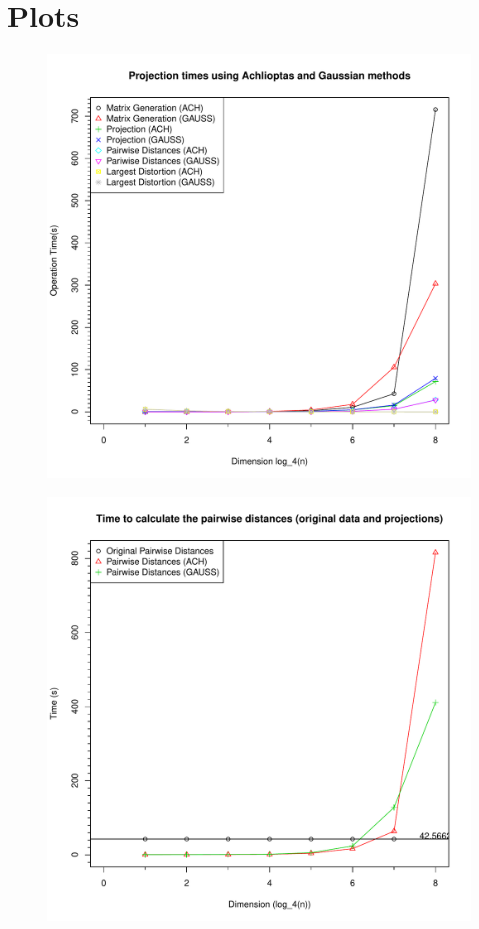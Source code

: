 \documentclass[]{article}
\begin{document}
\section{Plots}

\begin{figure}
	\centering
	\includegraphics[width=\columnwidth]{projection-times_log-scale.pdf}
	\caption{}
\end{figure}

\begin{figure}
	\centering
	\includegraphics[width=\columnwidth]{proj-times-comparison.pdf}
	\caption{}
\end{figure}
\end{document}
